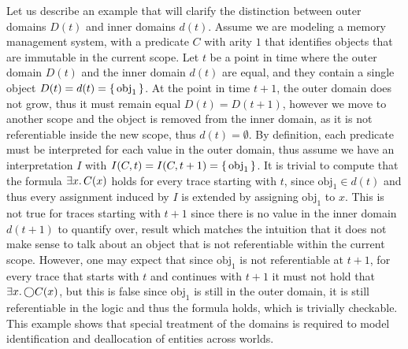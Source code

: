 \begin{example}\label{ex:domains}
  Let us describe an example that will clarify the distinction between outer domains $D(t)$ and inner domains $d(t)$.
  Assume we are modeling a memory management system, with a predicate $C$ with arity $1$ that identifies objects that
  are immutable in the current scope. Let $t$ be a point in time where the outer domain $D(t)$ and the inner domain
  $d(t)$ are equal, and they contain a single object $D(t) = d(t) = \set{\text{obj}_1}$.  At the point in time $t + 1$,
  the outer domain does not grow, thus it must remain equal $D(t) = D(t + 1)$, however we move to another scope and the
  object is removed from the inner domain, as it is not referentiable inside the new scope, thus $d(t) = \emptyset$. By
  definition, each predicate must be interpreted for each value in the outer domain, thus assume we have an
  interpretation $I$ with $I(C, t) = I(C, t + 1) = \set{\text{obj}_1}$. It is trivial to compute that the formula
  $\exists {x} \ldotp {C(x)}$ holds for every trace starting with $t$, since $\text{obj}_1 \in d(t)$ and thus every assignment
  induced by $I$ is extended by assigning $\text{obj}_1$ to $x$. This is not true for traces starting with $t + 1$ since
  there is no value in the inner domain $d(t + 1)$ to quantify over, result which matches the intuition that it does not
  make sense to talk about an object that is not referentiable within the current scope. However, one may expect that
  since $\text{obj}_1$ is not referentiable at $t + 1$, for every trace that starts with $t$ and continues with $t + 1$
  it must not hold that $\exists {x} \ldotp {\bigcirc{C(x)}}$, but this is false since $\text{obj}_1$ is still in the outer
  domain, it is still referentiable in the logic and thus the formula holds, which is trivially checkable. This example
  shows that special treatment of the domains is required to model identification and deallocation of entities
  across worlds.
\end{example}

